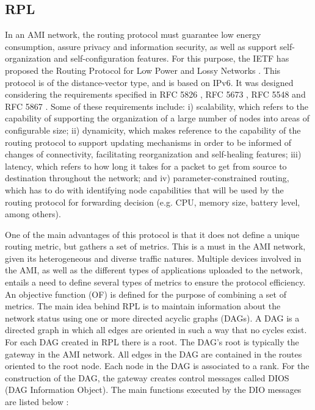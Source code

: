 \documentclass[11pt,draftclsnofoot,onecolumn]{IEEEtran}
\begin{document}
\subsection{RPL}\label{rpl}

In an AMI network, the routing protocol must guarantee low energy consumption, assure privacy and information security, as well as support self-organization and self-configuration features. For this purpose, the IETF has proposed the Routing Protocol for Low Power and Lossy Networks \cite{Winter2012}. This protocol is of the distance-vector type, and is based on IPv6. It was designed considering the requirements specified in RFC 5826 \cite{Brandt2010}, RFC 5673 \cite{Pister2009}, RFC 5548 \cite{Dohler2009} and RFC 5867 \cite{Martocci2010}. Some of these requirements include: i) scalability, which refers to the capability of supporting the organization of a large number of nodes into areas of configurable size; ii) dynamicity, which makes reference to the capability of the routing protocol to support updating mechanisms in order to be informed of changes of connectivity, facilitating reorganization and self-healing features; iii) latency, which refers to how long it takes for a packet to get from source to destination throughout the network; and iv) parameter-constrained routing, which has to do with identifying node capabilities that will be used by the routing protocol for forwarding decision (e.g. CPU, memory size, battery level, among others).

One of the main advantages of this protocol is that it does not define a unique routing metric, but gathers a set of metrics. This is a must in the AMI network, given its heterogeneous and diverse traffic natures. Multiple devices involved in the AMI, as well as the different types of applications uploaded to the network, entails a need to define several types of metrics to ensure the protocol efficiency. An objective function (OF) is defined for the purpose of combining a set of metrics. The main idea behind RPL is to maintain information about the network status using one or more directed acyclic graphs (DAGs). A DAG is a directed graph in which all edges are oriented in such a way that no cycles exist. For each DAG created in RPL there is a root. The DAG’s root is typically the gateway in the AMI network. All edges in the DAG are contained in the routes oriented to the root node. Each node in the DAG is associated to a rank. For the construction of the DAG, the gateway creates control messages called DIOS (DAG Information Object). The main functions executed by the DIO messages are listed below  \cite{Iyer2011a}:
\end{document}
